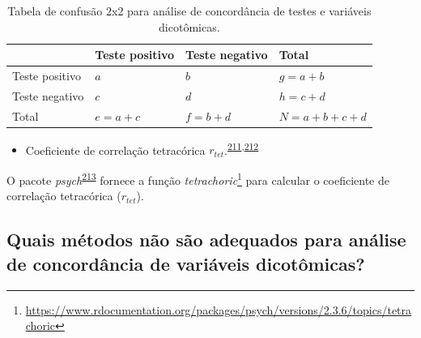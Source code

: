 \documentclass[
  a4paper,
]{book}
\providecommand{\tightlist}{%
  \setlength{\itemsep}{0pt}\setlength{\parskip}{0pt}}
\renewcommand{\href}[2]{#2\footnote{\url{#1}}}
\newenvironment{infobox}[1]
  {
  \begin{itemize}
  \renewcommand{\labelitemi}{
    \raisebox{-.7\height}[0pt][0pt]{
      {\setkeys{Gin}{width=3em,keepaspectratio}
        \texttt{[image: \#1]}}
    }
  }
  \setlength{\fboxsep}{1em}
  \begin{blackbox}
  \item
  }
  {
  \end{blackbox}
  \end{itemize}
  }
\begin{document}
\begin{table}

\caption{\label{tab:crosstable-kappa-2x2}Tabela de confusão 2x2 para análise de concordância de testes e variáveis dicotômicas.}
\centering
\begin{tabu} to 
\toprule
\textbf{ } & \textbf{Teste positivo} & \textbf{Teste negativo} & \textbf{Total}\\
\midrule
Teste positivo & $a$ & $b$ & $g=a+b$\\
Teste negativo & $c$ & $d$ & $h=c+d$\\
Total & $e=a+c$ & $f=b+d$ & $N=a+b+c+d$\\
\bottomrule
\end{tabu}
\end{table}

\begin{itemize}
\tightlist
\item
  Coeficiente de correlação tetracórica \(r_{tet}\).\textsuperscript{\protect\hyperlink{ref-i.mathe1901}{211},\protect\hyperlink{ref-banerjee1999}{212}}
\end{itemize}

\begin{infobox}{images/Rlogo}
O pacote \emph{psych}\textsuperscript{\protect\hyperlink{ref-psych}{213}} fornece a função \href{https://www.rdocumentation.org/packages/psych/versions/2.3.6/topics/tetrachoric}{\emph{tetrachoric}} para calcular o coeficiente de correlação tetracórica (\(r_{tet}\)).

\end{infobox}

\hypertarget{quais-muxe9todos-nuxe3o-suxe3o-adequados-para-anuxe1lise-de-concorduxe2ncia-de-variuxe1veis-dicotuxf4micas}{%
\subsection{Quais métodos não são adequados para análise de concordância de variáveis dicotômicas?}\label{quais-muxe9todos-nuxe3o-suxe3o-adequados-para-anuxe1lise-de-concorduxe2ncia-de-variuxe1veis-dicotuxf4micas}}
\end{document}
